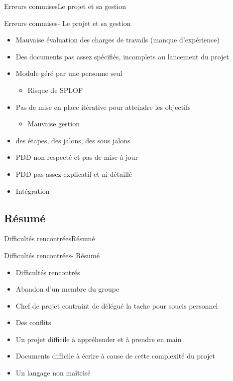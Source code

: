 	    \begin{frame}{Erreurs commises}{Le projet et sa gestion}
	    	\begin{block}{Erreurs commises- Le projet et sa gestion}
	    		\begin{itemize}
					\item<1-> Mauvaise évaluation des charges de travails (manque d’expérience)
					\item<2-> Des documents pas assez spécifiés, incomplets au lancement du projet
					\item<3-> Module géré par une personne seul
					\begin{itemize}
						\item<3-> Risque de SPLOF
					\end{itemize}
					\item<4-> Pas de mise en place itérative pour atteindre les objectifs
					\begin{itemize}
						\item<4-> Mauvaise gestion
					\end{itemize}

					\item<5-> des étapes, des jalons, des sous jalons
					\item<6-> PDD non respecté et pas de mise à jour
					\item<7-> PDD pas assez explicatif et ni détaillé
					\item<8-> Intégration
	    		\end{itemize}
	    	\end{block}
	    \end{frame}

	\subsection{Résumé}
		\begin{frame}{Difficultés rencontrées}{Résumé}
		    	\begin{block}{Difficultés rencontrées- Résumé}
		    		\begin{itemize}
						\item<1-> Difficultés rencontrés
						\item<2-> Abandon d’un membre du groupe 
						\item<3-> Chef de projet contraint de délégué la tache pour soucis personnel
						\item<4-> Des conflits
						\item<5-> Un projet difficile à appréhender et à prendre en main
						\item<6-> Documents difficile à écrire à cause de cette complexité du projet
						\item<7-> Un langage non maîtrisé
		    		\end{itemize}
		    	\end{block}
		\end{frame}

